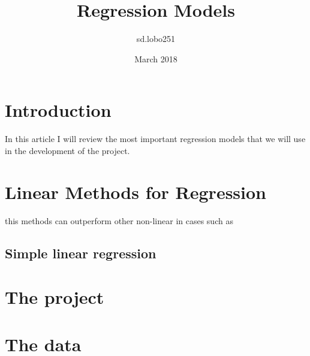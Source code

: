 \documentclass{article}
\title{Regression Models}
\author{sd.lobo251 }
\date{March 2018}
\begin{document}
\maketitle

\section{Introduction}

In this article I will review the most important regression models that we will use in the development of the project. 


\section{Linear Methods for Regression}

this methods can outperform other non-linear in cases such as \cite{Hastie2009}

\subsection{Simple linear regression}


\section{The project}

\section{The data}




\end{document}
